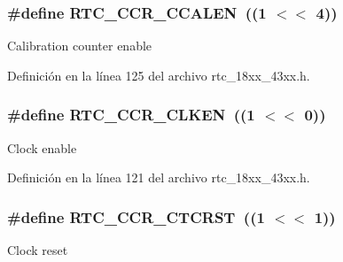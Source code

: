 \subsubsection[{\texorpdfstring{R\+T\+C\+\_\+\+C\+C\+R\+\_\+\+C\+C\+A\+L\+EN}{RTC_CCR_CCALEN}}]{\setlength{\rightskip}{0pt plus 5cm}\#define R\+T\+C\+\_\+\+C\+C\+R\+\_\+\+C\+C\+A\+L\+EN~((1 $<$$<$ 4))}\hypertarget{group___r_t_c__18_x_x__43_x_x_gaeb77b2340d896fae77ea670bb70e972e}{}\label{group___r_t_c__18_x_x__43_x_x_gaeb77b2340d896fae77ea670bb70e972e}
Calibration counter enable 

Definición en la línea 125 del archivo rtc\+\_\+18xx\+\_\+43xx.\+h.

\subsubsection[{\texorpdfstring{R\+T\+C\+\_\+\+C\+C\+R\+\_\+\+C\+L\+K\+EN}{RTC_CCR_CLKEN}}]{\setlength{\rightskip}{0pt plus 5cm}\#define R\+T\+C\+\_\+\+C\+C\+R\+\_\+\+C\+L\+K\+EN~((1 $<$$<$ 0))}\hypertarget{group___r_t_c__18_x_x__43_x_x_gad08af035635f5acd7931cb982f95e771}{}\label{group___r_t_c__18_x_x__43_x_x_gad08af035635f5acd7931cb982f95e771}
Clock enable 

Definición en la línea 121 del archivo rtc\+\_\+18xx\+\_\+43xx.\+h.

\subsubsection[{\texorpdfstring{R\+T\+C\+\_\+\+C\+C\+R\+\_\+\+C\+T\+C\+R\+ST}{RTC_CCR_CTCRST}}]{\setlength{\rightskip}{0pt plus 5cm}\#define R\+T\+C\+\_\+\+C\+C\+R\+\_\+\+C\+T\+C\+R\+ST~((1 $<$$<$ 1))}\hypertarget{group___r_t_c__18_x_x__43_x_x_ga70900054432c82dad7d63d4598502923}{}\label{group___r_t_c__18_x_x__43_x_x_ga70900054432c82dad7d63d4598502923}
Clock reset 

